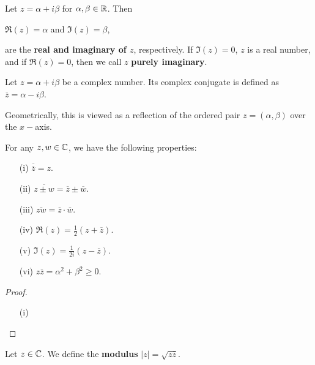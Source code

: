 \documentclass[a4paper]{report}
\begin{document}
\begin{definition}
   Let \( z = \alpha + i \beta  \) for \( \alpha, \beta \in \mathbb{R}  \). Then  
   \begin{center}
       \( \Re(z) = \alpha  \) and \( \Im(z) = \beta   \),
   \end{center}
   are the \textbf{real and imaginary of \( z  \)}, respectively.
   If \( \Im(z) = 0   \), \( z  \) is a real number, and if \( \Re(z) = 0  \), then we call \( z  \) \textbf{purely imaginary}.
\end{definition}

\begin{definition}
    Let \( z = \alpha + i \beta  \) be a complex number. Its complex conjugate is defined as \( \overline{z} = \alpha - i \beta  \).
\end{definition}

Geometrically, this is viewed as a reflection of the ordered pair \( z = (\alpha, \beta)  \) over the \( x- \)axis.

\begin{prop}
    For any \( z,w \in \mathbb{C}  \), we have the following properties:
   \begin{enumerate}
       \item[(i)] \( \overline{\overline{z}} = z  \).
        \item[(ii)] \( \overline{z \pm w} = \overline{z} \pm \overline{w} \). 
        \item[(iii)] \( \overline{zw} = \overline{z} \cdot \overline{w} \).
        \item[(iv)] \( \Re(z) = \frac{ 1 }{ 2 }  ( z + \overline{z}) \).
        \item[(v)] \( \Im(z) = \frac{ 1 }{ 2i } (z - \overline{z}) \). 
        \item[(vi)] \( z \overline{z} = \alpha^{2} + \beta^{2} \geq 0 \).
   \end{enumerate} 
\end{prop}
\begin{proof}
    \begin{enumerate}
        \item[(i)] 
    \end{enumerate}
\end{proof}

\begin{definition}
   Let \( z \in \mathbb{C}  \). We define the \textbf{modulus} \( | z  |  = \sqrt{ z \overline{z} }  \).
\end{definition}
\end{document}
